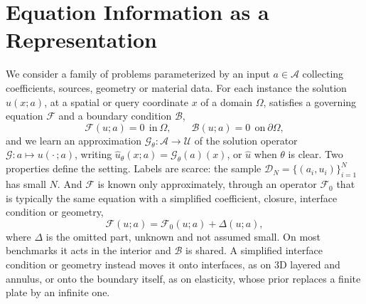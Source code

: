 \documentclass{article}
\begin{document}
\vspace{-3mm}
\section{Equation Information as a Representation}
\label{sec:framework}
\vspace{-3mm}
We consider a family of problems parameterized by an input $a\in\mathcal{A}$ collecting coefficients, sources, geometry or material data. For each instance the solution $u(x;a)$, at a spatial or query coordinate $x$ of a domain $\Omega$, satisfies a governing equation $\mathcal{F}$ and a boundary condition $\mathcal{B}$,
\begin{equation}
  \mathcal{F}\!\left(u;a\right)=0\ \ \text{in}\ \Omega,
  \qquad
  \mathcal{B}\!\left(u;a\right)=0\ \ \text{on}\ \partial\Omega,
  \label{eq:governing}
\end{equation}
and we learn an approximation $\mathcal{G}_\theta:\mathcal{A}\to\mathcal{U}$ of the solution operator $\mathcal{G}:a\mapsto u(\cdot\,;a)$, writing $\hat u_\theta(x;a)=\mathcal{G}_\theta(a)(x)$, or $\hat u$ when $\theta$ is clear. Two properties define the setting. Labels are scarce: the sample $\mathcal{D}_N=\{(a_i,u_i)\}_{i=1}^{N}$ has small $N$. And $\mathcal{F}$ is known only approximately, through an operator $\mathcal{F}_0$ that is typically the same equation with a simplified coefficient, closure, interface condition or geometry,
\begin{equation}
  \mathcal{F}(u;a)=\mathcal{F}_0(u;a)+\Delta(u;a),
  \label{eq:model-error}
\end{equation}
where $\Delta$ is the omitted part, unknown and not assumed small. On most benchmarks it acts in the interior and $\mathcal{B}$ is shared. A simplified interface condition or geometry instead moves it onto interfaces, as on 3D layered and annulus, or onto the boundary itself, as on elasticity, whose prior replaces a finite plate by an infinite one.
\end{document}
